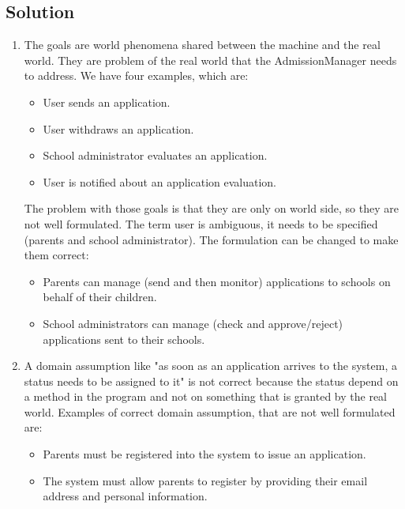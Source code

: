 \documentclass[12pt, a4paper]{report}
\begin{document}
    \subsection*{Solution}
        \begin{enumerate}
            \item The goals are world phenomena shared between the machine and the real world. They are problem of the real world that the AdmissionManager needs to address. We have 
                four examples, which are: 
                \begin{itemize}
                    \item User sends an application.
                    \item User withdraws an application.
                    \item School administrator evaluates an application.
                    \item User is notified about an application evaluation. 
                \end{itemize}
                The problem with those goals is that they are only on world side, so they are not well formulated. The term user is ambiguous, it needs to be specified (parents and school 
                administrator). The formulation can be changed to make them correct: 
                \begin{itemize}
                    \item Parents can manage (send and then monitor) applications to schools on behalf of their children.
                    \item School administrators can manage (check and approve/reject) applications sent to their schools.
                \end{itemize}
            \item A domain assumption like "as soon as an application arrives to the system, a status needs to be assigned to it" is not correct because the status depend on a method in 
                the program and not on something that is granted by the real world. Examples of correct domain assumption, that are not well formulated are: 
                \begin{itemize}
                    \item Parents must be registered into the system to issue an application. 
                    \item The system must allow parents to register by providing their email address and personal information.  
                \end{itemize}

\end{enumerate}
\end{document}

